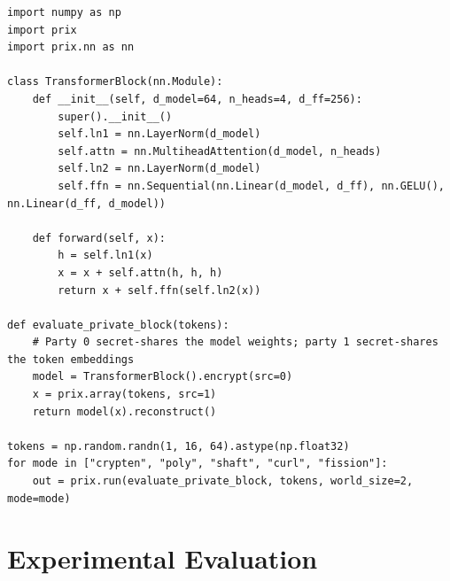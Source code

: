 \documentclass[11pt]{article}
\begin{document}
\begin{lstlisting}[style=pythonstyle, caption={Evaluating a private Transformer block under all five MPC approximation modes in PriX.}, label={lst:quickstart}]
import numpy as np
import prix
import prix.nn as nn

class TransformerBlock(nn.Module):
    def __init__(self, d_model=64, n_heads=4, d_ff=256):
        super().__init__()
        self.ln1 = nn.LayerNorm(d_model)
        self.attn = nn.MultiheadAttention(d_model, n_heads)
        self.ln2 = nn.LayerNorm(d_model)
        self.ffn = nn.Sequential(nn.Linear(d_model, d_ff), nn.GELU(), nn.Linear(d_ff, d_model))

    def forward(self, x):
        h = self.ln1(x)
        x = x + self.attn(h, h, h)
        return x + self.ffn(self.ln2(x))

def evaluate_private_block(tokens):
    # Party 0 secret-shares the model weights; party 1 secret-shares the token embeddings
    model = TransformerBlock().encrypt(src=0)
    x = prix.array(tokens, src=1)
    return model(x).reconstruct()

tokens = np.random.randn(1, 16, 64).astype(np.float32)
for mode in ["crypten", "poly", "shaft", "curl", "fission"]:
    out = prix.run(evaluate_private_block, tokens, world_size=2, mode=mode)
\end{lstlisting}

\section{Experimental Evaluation}
\label{sec:evaluation}
\end{document}
